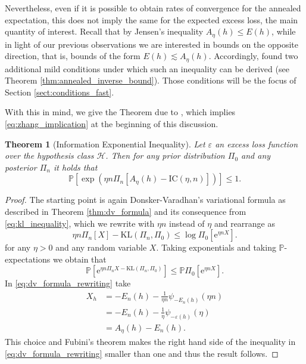 \documentclass{uvamath}
\newcommand*{\calH}{\mathcal{H}}
\newcommand*{\bbP}{\mathbb{P}}
\newcommand*{\sqbrack}[1]{\left[#1\right]}
\newcommand*{\paren}[1]{\left(#1\right)}
\newcommand*{\rme}{\mathrm{e}}
\newcommand*{\KL}{\mathrm{KL}}
\newcommand*{\IC}{\mathrm{IC}}
\newtheorem{theorem}{Theorem}[section]
\theoremstyle{remark}
\theoremstyle{definition}
\theoremstyle{definition}
\theoremstyle{definition}
\theoremstyle{definition}
\theoremstyle{definition}
\begin{document}
Nevertheless, even if it is possible to obtain rates of convergence
for the annealed expectation, this does not imply the same for the
expected excess loss, the main quantity of interest. Recall that by
Jensen's inequality $A_\eta(h)\leq E(h)$, while in light of our
previous observations we are interested in bounds on the opposite
direction, that is, bounds of the form $E(h)\lesssim A_\eta(h)$.
Accordingly, \citet{grunwald_fast_2016} found two additional mild
conditions under which such an inequality can be derived (see Theorem
\ref{thm:annealed_inverse_bound}). Those conditions will be the focus
of Section \ref{sect:conditions_fast}.

With this in mind, we give the Theorem due to \citet[Lemma
2.1]{zhang_information-theoretic_2006}, which implies
\eqref{eq:zhang_implication} at the beginning of this discussion.

\begin{theorem}[Information Exponential Inequality]
  \label{thm:zhang_inequality}
  Let $\varepsilon$ an excess loss function over the hypothesis class
  $\calH$. Then for any prior distribution $\Pi_0$ and any posterior
  $\Pi_n$ it holds that
  \begin{equation*}
    \bbP\sqbrack{\exp\paren{\eta n\Pi_n\sqbrack{ A_\eta(h) -
          \IC(\eta, n) }}} \leq  1.
  \end{equation*}
\end{theorem}
\begin{proof}
  The starting point is again Donsker-Varadhan's variational formula
  as described in Theorem \ref{thm:dv_formula} and its consequence
  from \eqref{eq:kl_inequality}, which we rewrite with $\eta n$
  instead of $\eta$ and rearrange as
  \begin{equation*}
    \eta n\Pi_n[ X] - \KL(\Pi_n, \Pi_0)\leq  \log \Pi_0[\rme^{\eta n X}]  .
  \end{equation*}
  for any $\eta>0$ and any random variable $X$.  Taking exponentials and
  taking $\bbP$-expectations we obtain that
  \begin{equation}\label{eq:dv_formula_rewriting}
    \bbP[\rme^{\eta n \Pi_n X - \KL(\Pi_n, \Pi_0)}] \leq
    \bbP\Pi_0[\rme^{\eta n X}].
  \end{equation}
  In \eqref{eq:dv_formula_rewriting} take
  \begin{align*}
    X_h &= - E_n(h) - \frac{1}{\eta n}\psi_{ - E_n(h)}(\eta n
          )\\
        & =  - E_n(h) - \frac{1}{\eta }\psi_{ -
          \varepsilon(h)}(\eta)\\
        &= A_{\eta}(h) - E_n(h).
  \end{align*}
  This choice and Fubini's theorem makes the right hand side of the
  inequality in \eqref{eq:dv_formula_rewriting} smaller than one and
  thus the result follows.
\end{proof}
\end{document}
